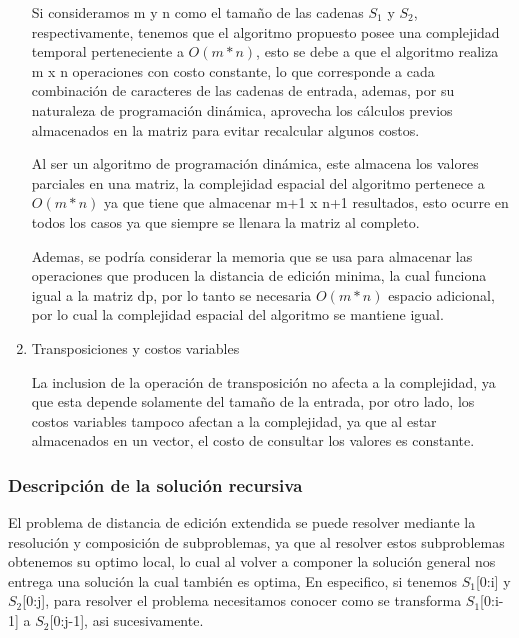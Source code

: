 \begin{enumerate}[1)]
    Si consideramos m y n como el tamaño de las cadenas $S_1$ y $S_2$, 
    respectivamente, tenemos que
    el algoritmo propuesto posee una complejidad temporal 
    perteneciente a $O\left(m*n\right)$, esto
    se debe a que el algoritmo realiza m x n operaciones con costo constante, lo que corresponde
    a cada combinación de caracteres de las cadenas de entrada, ademas, por su naturaleza
    de programación dinámica, aprovecha los cálculos previos almacenados en la matriz para 
    evitar recalcular algunos costos.
    
    Al ser un algoritmo de programación dinámica, este almacena los valores parciales en una matriz, 
    la complejidad espacial del algoritmo pertenece a $O\left(m*n\right)$ 
    ya que tiene que almacenar m+1 x n+1 resultados, esto ocurre en todos los casos
    ya que siempre se llenara la matriz al completo.
    
    Ademas, se podría considerar la memoria que se usa para almacenar las operaciones
    que producen la distancia de edición minima, la cual funciona igual a la matriz dp,
    por lo tanto se necesaria $O\left(m*n\right)$ espacio adicional, por lo cual
    la complejidad espacial del algoritmo se mantiene igual.


    \item Transposiciones y costos variables
    
    La inclusion de la operación de transposición no afecta
    a la complejidad, ya que esta depende solamente del tamaño de la entrada,
    por otro lado, los costos variables tampoco afectan a la complejidad, ya que
    al estar almacenados en un vector, el costo de consultar los valores es constante.

\end{enumerate}

\subsubsection{Descripción de la solución recursiva}

El problema de distancia de edición extendida se puede resolver
mediante la resolución y composición
de subproblemas, ya que al resolver estos subproblemas obtenemos
su optimo local, lo cual al volver a componer la solución general
nos entrega una solución la cual también es optima, En especifico,
si tenemos $S_1$[0:i] y $S_2$[0:j], para resolver el problema
necesitamos conocer como se transforma $S_1$[0:i-1] a $S_2$[0:j-1], asi sucesivamente.

